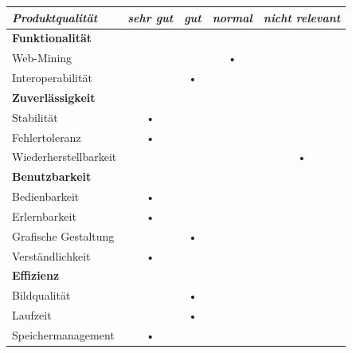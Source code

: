 \documentclass[10pt]{scrreprt}
\begin{document}
\vspace{1cm}
\begin{center}
\begin{tabular}{lcccc}
\hline 
\rule[-1ex]{0pt}{4ex} \textit{Produktqualität} & \textit{sehr gut} & \textit{gut} & \textit{normal} & \textit{nicht relevant} \\ 
\hline 
\rule[-1ex]{0pt}{4ex} \textbf{Funktionalität} &  &  &  &  \\ 
\rule[-1ex]{0pt}{4ex} \hspace{10pt} Web-Mining & &  & • & \\ 
\rule[-1ex]{0pt}{4ex} \hspace{10pt} Interoperabilität & & • & & \\ 

\hline 
\rule[-1ex]{0pt}{4ex} \textbf{Zuverlässigkeit} &  &  &  &  \\ 
\rule[-1ex]{0pt}{4ex} \hspace{10pt} Stabilität & • & & & \\ 
\rule[-1ex]{0pt}{4ex} \hspace{10pt} Fehlertoleranz & • & & & \\ 
\rule[-1ex]{0pt}{4ex} \hspace{10pt} Wiederherstellbarkeit &  &  &  & • \\ 

\hline 
\rule[-1ex]{0pt}{4ex} \textbf{Benutzbarkeit} &  &  &  &  \\ 
\rule[-1ex]{0pt}{4ex} \hspace{10pt} Bedienbarkeit & • & & & \\ 
\rule[-1ex]{0pt}{4ex} \hspace{10pt} Erlernbarkeit & • & & & \\ 
\rule[-1ex]{0pt}{4ex} \hspace{10pt} Grafische Gestaltung & & • & & \\ 
\rule[-1ex]{0pt}{4ex} \hspace{10pt} Verständlichkeit & • & & & \\ 

\hline 
\rule[-1ex]{0pt}{4ex} \textbf{Effizienz} &  &  &  &  \\ 
\rule[-1ex]{0pt}{4ex} \hspace{10pt} Bildqualität & & • & & \\ 
\rule[-1ex]{0pt}{4ex} \hspace{10pt} Laufzeit & & • & & \\ 
\rule[-1ex]{0pt}{4ex} \hspace{10pt} Speichermanagement & • & & & \\ 


\end{tabular}
\end{center}
\end{document}
